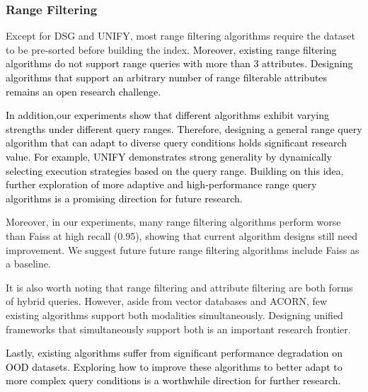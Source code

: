 \documentclass[sigconf, nonacm, pdfa]{acmart}
\begin{document}
{	
	\subsubsection{Range Filtering}
	Except for DSG and UNIFY, most range filtering algorithms require the dataset to be pre-sorted before building the index. \textcolor{black}{Moreover, existing range filtering algorithms do not support range queries with more than 3 attributes.} \textcolor{black}{Designing algorithms that support an arbitrary number of range filterable attributes remains an open research challenge.}
	

\textcolor{black}{
In addition,our experiments show that different algorithms exhibit varying strengths under different query ranges. Therefore, designing a general range query algorithm that can adapt to diverse query conditions holds significant research value. For example, UNIFY demonstrates strong generality by dynamically selecting execution strategies based on the query range. Building on this idea, further exploration of more adaptive and high-performance range query algorithms is a promising direction for future research.}
	
Moreover, in our experiments, many range filtering algorithms perform worse than Faiss at high recall (0.95), showing that current algorithm designs still need improvement. We suggest future future range filtering algorithms include Faiss as a baseline.
	
It is also worth noting that range filtering and attribute filtering are both forms of hybrid queries. However, aside from vector databases and ACORN, few existing algorithms support both modalities simultaneously. Designing unified frameworks that simultaneously support both is an important research frontier. 
	
	\textcolor{black}{
	Lastly, existing algorithms suffer from significant performance degradation on OOD datasets. Exploring how to improve these algorithms to better adapt to more complex query conditions is a worthwhile direction for further research.}
	


	
}
\end{document}

